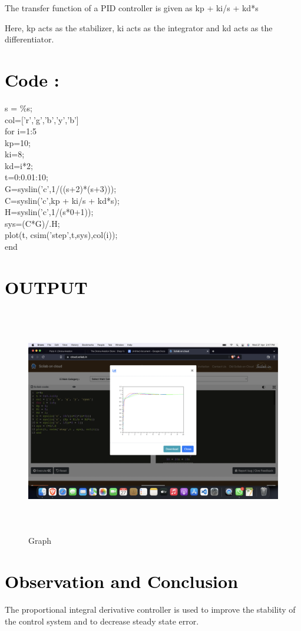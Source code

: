 \documentclass[12pt]{article}
\begin{document}
The transfer function of a PID controller is given as
kp + ki/s + kd*s

Here, kp acts as the stabilizer, ki acts as the integrator and kd acts as the differentiator.

 \par

\section*{\textcolor{black}{Code :}}

s = \%s;\\
col=['r','g','b','y','b']\\
for i=1:5\\
kp=10;\\
ki=8;\\
kd=i*2;\\
t=0:0.01:10;\\
G=syslin('c',1/((s+2)*(s+3)));\\
C=syslin('c',kp + ki/s + kd*s);\\
H=syslin('c',1/(s*0+1));\\
sys=(C*G)/.H;\\
plot(t, csim('step',t,sys),col(i));\\
end\\


  \par 

\section*{\textcolor{black}{OUTPUT}}

\begin{figure}[!hth]
        \centering
        \includegraphics[width =20cm, height = 10cm]{images/PID.png}
        \caption{Graph}
        \label{Graph}
\end{figure}

\section*{\textcolor{black}{Observation and Conclusion}}
The proportional integral derivative controller is used to improve the stability of the control system and to decrease steady state error.

\pagebreak
\end{document}
